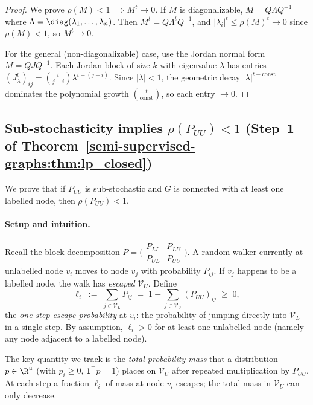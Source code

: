 \begin{notechapter}
\begin{proof}
We prove $\rho(M) < 1 \implies M^t \to 0$. If $M$ is diagonalizable,
$M = Q\Lambda Q^{-1}$ where $\Lambda = \diag(\lambda_1, \ldots, \lambda_n)$.
Then $M^t = Q\Lambda^t Q^{-1}$, and $|\lambda_i|^t \leq \rho(M)^t \to 0$ since
$\rho(M) < 1$, so $M^t \to 0$.

For the general (non-diagonalizable) case, use the Jordan normal form
$M = QJQ^{-1}$. Each Jordan block of size $k$ with eigenvalue $\lambda$ has
entries $(J_\lambda^t)_{ij} = \binom{t}{j-i}\lambda^{t-(j-i)}$. Since
$|\lambda| < 1$, the geometric decay $|\lambda|^{t-\text{const}}$ dominates
the polynomial growth $\binom{t}{\text{const}}$, so each entry $\to 0$.
\end{proof}

\subsection{Sub-stochasticity implies $\rho(P_{UU})<1$ (Step~1 of
  Theorem~\ref{semi-supervised-graphs:thm:lp_closed})}
\label{semi-supervised-graphs:app:substochastic}

We prove that if $P_{UU}$ is sub-stochastic and $G$ is connected with at least
one labelled node, then $\rho(P_{UU}) < 1$.

\paragraph{Setup and intuition.}
Recall the block decomposition $P = \bigl(\begin{smallmatrix}P_{LL}&P_{LU}\\
P_{UL}&P_{UU}\end{smallmatrix}\bigr)$.  A random walker currently at unlabelled
node $v_i$ moves to node $v_j$ with probability $P_{ij}$.  If $v_j$ happens to
be a labelled node, the walk has \emph{escaped} $\mathcal{V}_U$.  Define
\[
  \ell_i \;:=\; \sum_{j \in \mathcal{V}_L} P_{ij}
  \;=\; 1 - \sum_{j \in \mathcal{V}_U}(P_{UU})_{ij} \;\geq\; 0,
\]
the \emph{one-step escape probability} at $v_i$: the probability of jumping
directly into $\mathcal{V}_L$ in a single step.  By assumption, $\ell_i > 0$
for at least one unlabelled node (namely any node adjacent to a labelled node).

The key quantity we track is the \emph{total probability mass} that a
distribution $p \in \R^u$ (with $p_i \geq 0$, $\mathbf{1}^\top p = 1$) places
on $\mathcal{V}_U$ after repeated multiplication by $P_{UU}$.  At each step a
fraction $\ell_i$ of mass at node $v_i$ escapes; the total mass in
$\mathcal{V}_U$ can only decrease.


\end{notechapter}
